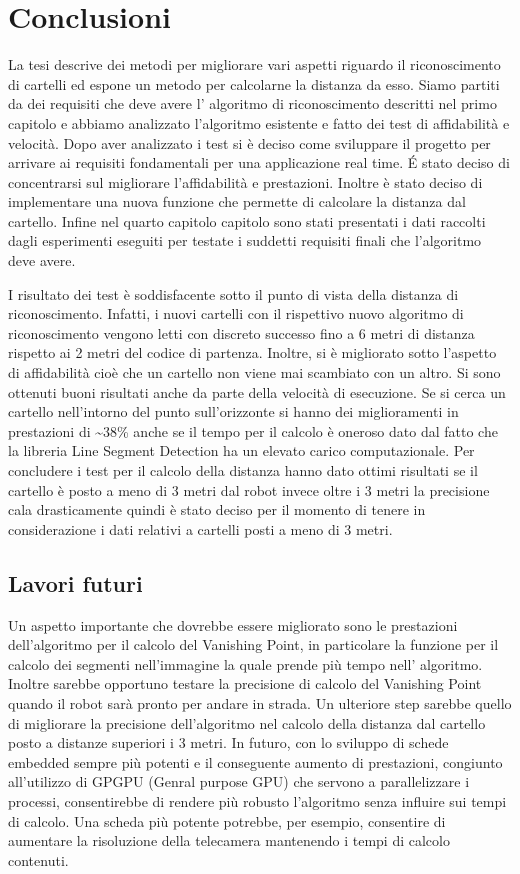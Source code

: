 
\chapter{Conclusioni}

	La tesi descrive dei metodi per migliorare vari aspetti riguardo il riconoscimento di cartelli ed espone un metodo per calcolarne la distanza da esso. Siamo partiti da dei requisiti che deve avere l' algoritmo di riconoscimento descritti nel primo capitolo e abbiamo analizzato l'algoritmo esistente e fatto dei test di affidabilità e velocità. Dopo aver analizzato i test si è deciso come sviluppare il progetto per arrivare ai requisiti fondamentali per una applicazione real time. \'E stato deciso di concentrarsi sul migliorare l'affidabilità e prestazioni. Inoltre è stato deciso di implementare una nuova funzione che permette di calcolare la distanza dal cartello. Infine nel quarto capitolo capitolo sono stati presentati i dati raccolti dagli esperimenti eseguiti per testate i suddetti requisiti finali che l'algoritmo deve avere.

	I risultato dei test è soddisfacente sotto il punto di vista della distanza di riconoscimento. Infatti, i nuovi cartelli con il rispettivo nuovo algoritmo di riconoscimento vengono letti con discreto successo fino a 6 metri di distanza rispetto ai 2 metri del codice di partenza. Inoltre, si è migliorato sotto l'aspetto di affidabilità cioè che un cartello non viene mai scambiato con un altro. Si sono ottenuti buoni risultati anche da parte della velocità di esecuzione. Se si cerca un cartello nell'intorno del punto sull'orizzonte si hanno dei miglioramenti in prestazioni di \textasciitilde $38$\% anche se il tempo per il calcolo è oneroso dato dal fatto che la libreria Line Segment Detection ha un elevato carico computazionale. Per concludere i test per il calcolo della distanza hanno dato ottimi risultati se il cartello è posto a meno di 3 metri dal robot invece oltre i 3 metri la precisione cala drasticamente quindi è stato deciso per il momento di tenere in considerazione i dati relativi a cartelli posti a meno di 3 metri.

\section{Lavori futuri}

	Un aspetto importante che dovrebbe essere migliorato sono le prestazioni dell'algoritmo per il calcolo del Vanishing Point, in particolare la funzione per il calcolo dei segmenti nell'immagine la quale prende più tempo nell' algoritmo. Inoltre sarebbe opportuno testare la precisione di calcolo del Vanishing Point quando il robot sarà pronto per andare in strada. Un ulteriore step sarebbe quello di migliorare la precisione dell'algoritmo nel calcolo della distanza dal cartello posto a distanze superiori i 3 metri. In futuro, con lo sviluppo di schede embedded sempre più potenti e il conseguente aumento di prestazioni, congiunto all'utilizzo di GPGPU (Genral purpose GPU) che servono a parallelizzare i processi, consentirebbe di rendere più robusto l'algoritmo senza influire sui tempi di calcolo. Una scheda più potente potrebbe, per esempio, consentire di aumentare la risoluzione della telecamera mantenendo i tempi di calcolo contenuti.